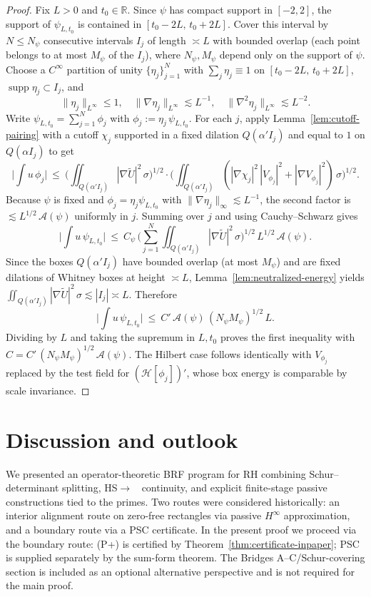 \documentclass[11pt]{article}
\theoremstyle{definition}
\theoremstyle{remark}
\newcommand{\R}{\mathbb{R}}
\DeclareMathOperator{\dettwo}{det_2}
\begin{document}
\begin{proof}
Fix $L>0$ and $t_0\in\R$. Since $\psi$ has compact support in $[-2,2]$, the support of $\psi_{L,t_0}$ is contained in $[t_0-2L,\,t_0+2L]$. Cover this interval by $N\le N_\psi$ consecutive intervals $I_j$ of length $\asymp L$ with bounded overlap (each point belongs to at most $M_\psi$ of the $I_j$), where $N_\psi,M_\psi$ depend only on the support of $\psi$. Choose a $C^\infty$ partition of unity $\{\eta_j\}_{j=1}^{N}$ with $\sum_j \eta_j\equiv 1$ on $[t_0-2L,\,t_0+2L]$, $\operatorname{supp}\eta_j\subset I_j$, and
\[\|\eta_j\|_{L^\infty}\le 1,\quad \|\nabla\eta_j\|_{L^\infty}\lesssim L^{-1},\quad \|\nabla^2\eta_j\|_{L^\infty}\lesssim L^{-2}.\]
Write $\psi_{L,t_0}=\sum_{j=1}^{N}\phi_j$ with $\phi_j:=\eta_j\,\psi_{L,t_0}$. For each $j$, apply Lemma~\ref{lem:cutoff-pairing} with a cutoff $\chi_j$ supported in a fixed dilation $Q(\alpha' I_j)$ and equal to $1$ on $Q(\alpha I_j)$ to get
\[
 \Big|\int u\,\phi_j\Big|\ \le\ \Big(\iint_{Q(\alpha' I_j)} |\nabla \widetilde U|^2\,\sigma\Big)^{1/2}
 \cdot \Big(\iint_{Q(\alpha' I_j)} (|\nabla\chi_j|^2\,|V_{\phi_j}|^2+|\nabla V_{\phi_j}|^2)\,\sigma\Big)^{1/2}.
\]
Because $\psi$ is fixed and $\phi_j=\eta_j\psi_{L,t_0}$ with $\|\nabla\eta_j\|_\infty\lesssim L^{-1}$, the second factor is $\lesssim L^{1/2}\,\mathcal A(\psi)$ uniformly in $j$. Summing over $j$ and using Cauchy--Schwarz gives
\[\Big|\int u\,\psi_{L,t_0}\Big|\ \le\ C_\psi\,\Big(\sum_{j=1}^N \iint_{Q(\alpha' I_j)} |\nabla \widetilde U|^2\,\sigma\Big)^{1/2}\,L^{1/2}\,\mathcal A(\psi).\]
Since the boxes $Q(\alpha' I_j)$ have bounded overlap (at most $M_\psi$) and are fixed dilations of Whitney boxes at height $\asymp L$, Lemma~\ref{lem:neutralized-energy} yields $\iint_{Q(\alpha' I_j)} |\nabla \widetilde U|^2\,\sigma\lesssim |I_j|\asymp L$. Therefore
\[\Big|\int u\,\psi_{L,t_0}\Big|\ \le\ C'\,\mathcal A(\psi)\,(N_\psi M_\psi)^{1/2}\,L.\]
Dividing by $L$ and taking the supremum in $L,t_0$ proves the first inequality with $C=C'\,(N_\psi M_\psi)^{1/2}\,\mathcal A(\psi)$. The Hilbert case follows identically with $V_{\phi_j}$ replaced by the test field for $(\mathcal H[\phi_j])'$, whose box energy is comparable by scale invariance.\end{proof}

\section{Discussion and outlook}\label{sec:discussion}
We presented an operator-theoretic BRF program for RH combining Schur--determinant splitting, HS\(\to\)\(\dettwo\) continuity, and explicit finite-stage passive constructions tied to the primes. Two routes were considered historically: an interior alignment route on zero-free rectangles via passive $H^\infty$ approximation, and a boundary route via a PSC certificate. In the present proof we proceed via the boundary route: (P+) is certified by Theorem~\ref{thm:certificate-inpaper}; PSC is supplied separately by the sum-form theorem. The Bridges A--C/Schur-covering section is included as an optional alternative perspective and is not required for the main proof.
\end{document}
